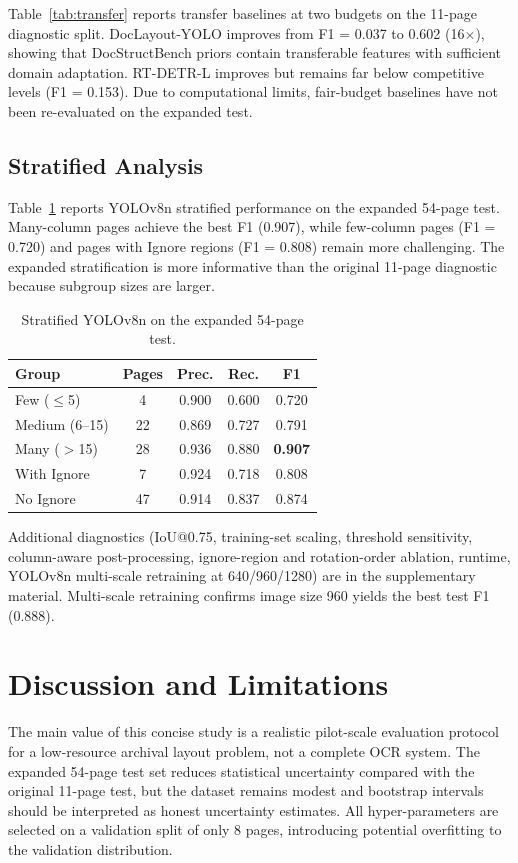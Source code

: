 \documentclass[5p,times,twocolumn]{elsarticle}
\begin{document}
Table~\ref{tab:transfer} reports transfer baselines at two budgets on the 11-page diagnostic split. DocLayout-YOLO improves from F1 = 0.037 to 0.602 (16$\times$), showing that DocStructBench priors contain transferable features with sufficient domain adaptation. RT-DETR-L improves but remains far below competitive levels (F1 = 0.153). Due to computational limits, fair-budget baselines have not been re-evaluated on the expanded test.

\subsection{Stratified Analysis}
Table~\ref{tab:stratified} reports YOLOv8n stratified performance on the expanded 54-page test. Many-column pages achieve the best F1 (0.907), while few-column pages (F1 = 0.720) and pages with Ignore regions (F1 = 0.808) remain more challenging. The expanded stratification is more informative than the original 11-page diagnostic because subgroup sizes are larger.

\begin{table}[!ht]
\centering
\caption{Stratified YOLOv8n on the expanded 54-page test.}
\label{tab:stratified}
\begin{tabular}{lcccc}
\toprule
Group & Pages & Prec. & Rec. & F1 \\
\midrule
Few ($\leq$5) & 4 & 0.900 & 0.600 & 0.720 \\
Medium (6--15) & 22 & 0.869 & 0.727 & 0.791 \\
Many ($>$15) & 28 & 0.936 & 0.880 & \textbf{0.907} \\
With Ignore & 7 & 0.924 & 0.718 & 0.808 \\
No Ignore & 47 & 0.914 & 0.837 & 0.874 \\
\bottomrule
\end{tabular}
\end{table}

Additional diagnostics (IoU@0.75, training-set scaling, threshold sensitivity, column-aware post-processing, ignore-region and rotation-order ablation, runtime, YOLOv8n multi-scale retraining at 640/960/1280) are in the supplementary material. Multi-scale retraining confirms image size 960 yields the best test F1 (0.888).

\section{Discussion and Limitations}
The main value of this concise study is a realistic pilot-scale evaluation protocol for a low-resource archival layout problem, not a complete OCR system. The expanded 54-page test set reduces statistical uncertainty compared with the original 11-page test, but the dataset remains modest and bootstrap intervals should be interpreted as honest uncertainty estimates. All hyper-parameters are selected on a validation split of only 8 pages, introducing potential overfitting to the validation distribution.
\end{document}
